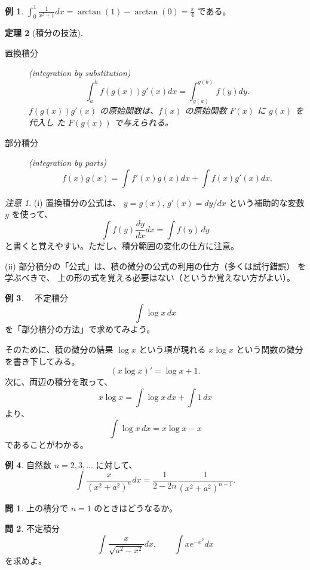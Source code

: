 \documentclass[a4paper]{jsarticle}
\newtheorem{Theorem}{定理}[section]
\theoremstyle{definition}
\newtheorem{Example}[Theorem]{例}
\newtheorem{Exercise}{問}%
\theoremstyle{remark}
\newtheorem{Remark}{注意}
\begin{document}
\bigskip
\begin{Example}
$\displaystyle
\int_0^1 \frac{1}{x^2+1} dx = \arctan(1) - \arctan(0) = \frac{\pi}{4}$ である。
\end{Example}

\bigskip
\begin{Theorem}[積分の技法]~
\begin{description}
\item[置換積分] (integration by substitution)
\[
\int_a^b f(g(x)) g'(x) dx = \int_{g(a)}^{g(b)} f(y) dy.
\]
$f(g(x))g'(x)$ の原始関数は、$f(x)$ の原始関数 $F(x)$ に $g(x)$ を代入し
た
$F(g(x))$ で与えられる。
\item[部分積分] (integration by parts)
\[
f(x)g(x) = \int f'(x)g(x) dx + \int f(x)g'(x) dx.
\]
\end{description}
\end{Theorem}

\begin{Remark}
{\small
(i) 置換積分の公式は、
$y= g(x)$, $g'(x) = dy/dx$ という補助的な変数 $y$ を使って、
\[
\int f(y) \frac{dy}{dx} dx = \int f(y)\,dy
\]
と書くと覚えやすい。ただし、積分範囲の変化の仕方に注意。

(ii) 部分積分の「公式」は、積の微分の公式の利用の仕方（多くは試行錯誤）
を学ぶべきで、
上の形の式を覚える必要はない（というか覚えない方がよい）。
}
\end{Remark}

\begin{Example}　不定積分
\[
\int \log x\,dx
\]
を「部分積分の方法」で求めてみよう。

そのために、積の微分の結果 $\log x$ という項が現れる
$x\log x$ という関数の微分を書き下してみる。
\[
(x\log x)' = \log x + 1.
\]
次に、両辺の積分を取って、
\[
x\log x = \int \log x\,dx + \int 1\,dx
\]
より、
\[
\int \log x\,dx = x\log x - x
\]
であることがわかる。
\end{Example}

\begin{Example}\label{ratio1}
自然数 $n=2,3,\dots$ に対して、
\[
\int \frac{x}{(x^2 + a^2)^n}dx = \frac{1}{2-2n} \frac{1}{(x^2 +
a^2)^{n-1}}.
\]
\end{Example}

\begin{Exercise}
上の積分で $n=1$ のときはどうなるか。
\end{Exercise}

\begin{Exercise}
不定積分
\[
\int \frac{x}{\sqrt{a^2-x^2}}dx,
\qquad
\int x e^{-x^2}dx
\]
を求めよ。
\end{Exercise}
\end{document}

